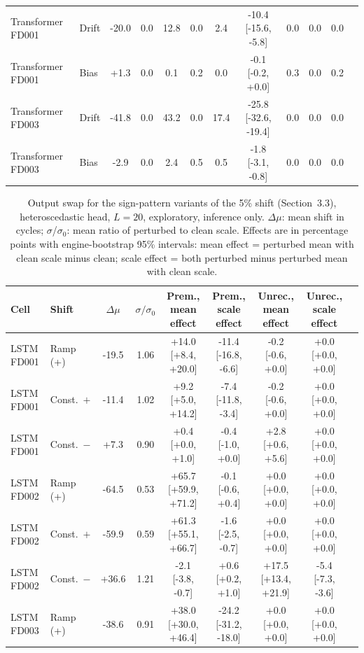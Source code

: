 \documentclass[10pt,a4paper]{article}
\begin{document}
\begin{landscape}
\begin{table}[H]
\begin{tabular}{llcccccccccc}
Transformer FD001 & Drift & -20.0 & 0.0 & 12.8 & 0.0 & 2.4 & -10.4 [-15.6, -5.8] & 0.0 & 0.0 & 0.0 \\
Transformer FD001 & Bias & +1.3 & 0.0 & 0.1 & 0.2 & 0.0 & -0.1 [-0.2, +0.0] & 0.3 & 0.0 & 0.2 \\
Transformer FD003 & Drift & -41.8 & 0.0 & 43.2 & 0.0 & 17.4 & -25.8 [-32.6, -19.4] & 0.0 & 0.0 & 0.0 \\
Transformer FD003 & Bias & -2.9 & 0.0 & 2.4 & 0.5 & 0.5 & -1.8 [-3.1, -0.8] & 0.0 & 0.0 & 0.0 \\
\bottomrule\end{tabular}
\end{table}
\begin{table}[H]\centering\scriptsize
\caption{Output swap for the sign-pattern variants of the 5\% shift (Section~3.3), heteroscedastic head, $L=20$, exploratory, inference only. $\Delta\mu$: mean shift in cycles; $\sigma$/$\sigma_0$: mean ratio of perturbed to clean scale. Effects are in percentage points with engine-bootstrap 95\% intervals: mean effect = perturbed mean with clean scale minus clean; scale effect = both perturbed minus perturbed mean with clean scale.}\label{tab:cohswap}
\begin{tabular}{llccccccc}\toprule
Cell & Shift & $\Delta\mu$ & $\sigma/\sigma_0$ & Prem., mean effect & Prem., scale effect & Unrec., mean effect & Unrec., scale effect \\ \midrule
LSTM FD001 & Ramp (+) & -19.5 & 1.06 & +14.0 [+8.4, +20.0] & -11.4 [-16.8, -6.6] & -0.2 [-0.6, +0.0] & +0.0 [+0.0, +0.0] \\
LSTM FD001 & Const.\ $+$ & -11.4 & 1.02 & +9.2 [+5.0, +14.2] & -7.4 [-11.8, -3.4] & -0.2 [-0.6, +0.0] & +0.0 [+0.0, +0.0] \\
LSTM FD001 & Const.\ $-$ & +7.3 & 0.90 & +0.4 [+0.0, +1.0] & -0.4 [-1.0, +0.0] & +2.8 [+0.6, +5.6] & +0.0 [+0.0, +0.0] \\
LSTM FD002 & Ramp (+) & -64.5 & 0.53 & +65.7 [+59.9, +71.2] & -0.1 [-0.6, +0.4] & +0.0 [+0.0, +0.0] & +0.0 [+0.0, +0.0] \\
LSTM FD002 & Const.\ $+$ & -59.9 & 0.59 & +61.3 [+55.1, +66.7] & -1.6 [-2.5, -0.7] & +0.0 [+0.0, +0.0] & +0.0 [+0.0, +0.0] \\
LSTM FD002 & Const.\ $-$ & +36.6 & 1.21 & -2.1 [-3.8, -0.7] & +0.6 [+0.2, +1.0] & +17.5 [+13.4, +21.9] & -5.4 [-7.3, -3.6] \\
LSTM FD003 & Ramp (+) & -38.6 & 0.91 & +38.0 [+30.0, +46.4] & -24.2 [-31.2, -18.0] & +0.0 [+0.0, +0.0] & +0.0 [+0.0, +0.0] \\

\end{tabular}
\end{table}
\end{landscape}
\end{document}
